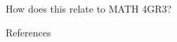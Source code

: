 \documentclass[final]{beamer}
\newlength{\sepwidth}
\newlength{\colwidth}
\newcommand{\separatorcolumn}{\begin{column}{\sepwidth}\end{column}}
\begin{document}
\begin{frame}[t]
\begin{columns}[t]
\begin{column}{\colwidth}
\begin{alertblock}{How does this relate to MATH 4GR3?}

  \end{alertblock}

  \begin{block}{References}

    \nocite{*}
    \footnotesize{}

  \end{block}

\end{column}

\separatorcolumn
\end{columns}
\end{frame}
\end{document}
